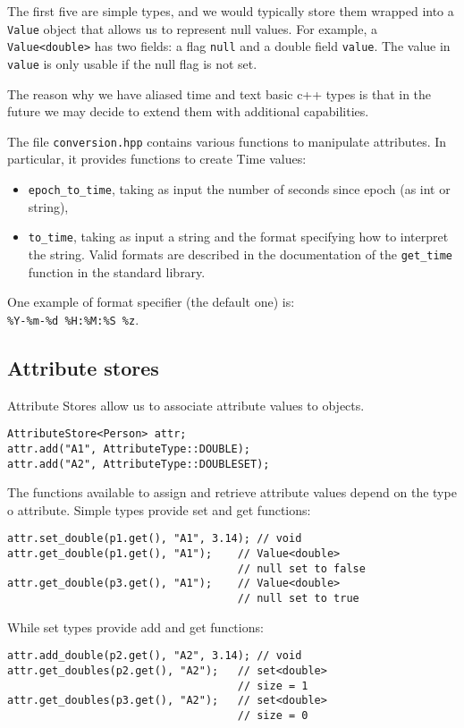 The first five are simple types, and we would typically store them wrapped into a \texttt{Value} object that allows us to represent null values. For example, a \texttt{Value<double>} has two fields: a flag \texttt{null} and a double field \texttt{value}. The value in \texttt{value} is only usable if the null flag is not set.

The reason why we have aliased time and text basic c++ types is that in the future we may decide to extend them with additional capabilities.

The file \texttt{conversion.hpp} contains various functions to manipulate attributes. In particular, it provides functions to create Time values:
\begin{itemize}
    \item \texttt{epoch\_to\_time}, taking as input the number of seconds since epoch (as int or string),
    \item \texttt{to\_time}, taking as input a string and the format specifying how to interpret the string. Valid formats are described in the documentation of the \texttt{get\_time} function in the standard library.
\end{itemize}
One example of format specifier (the default one) is:\\ \texttt{\%Y-\%m-\%d~\%H:\%M:\%S~\%z}.

\subsection{Attribute stores} \label{ch:core:attr}

Attribute Stores allow us to associate attribute values to objects.
\begin{lstlisting}[style=c++]
AttributeStore<Person> attr;
attr.add("A1", AttributeType::DOUBLE);
attr.add("A2", AttributeType::DOUBLESET);
\end{lstlisting}
The functions available to assign and retrieve attribute values depend on the type o attribute. Simple types provide set and get functions:
\begin{lstlisting}[style=c++]
attr.set_double(p1.get(), "A1", 3.14); // void
attr.get_double(p1.get(), "A1");    // Value<double>
                                    // null set to false
attr.get_double(p3.get(), "A1");    // Value<double>
                                    // null set to true
\end{lstlisting}
While set types provide add and get functions:
\begin{lstlisting}[style=c++]
attr.add_double(p2.get(), "A2", 3.14); // void
attr.get_doubles(p2.get(), "A2");   // set<double>
                                    // size = 1
attr.get_doubles(p3.get(), "A2");   // set<double>
                                    // size = 0
\end{lstlisting}

